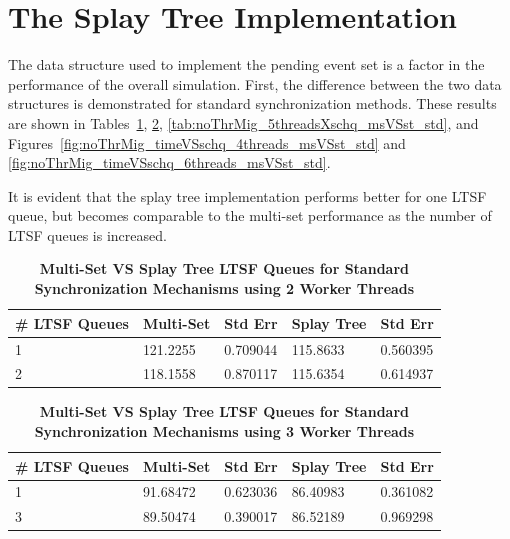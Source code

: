 \documentclass[11pt]{book}
\begin{document}
\section{The Splay Tree Implementation}

The data structure used to implement the pending event set is a factor in the performance
of the overall simulation.  First, the difference between the two data structures is
demonstrated for standard synchronization methods.  These results are shown in
Tables~\ref{tab:noThrMig_2threadsXschq_msVSst_std},
\ref{tab:noThrMig_3threadsXschq_msVSst_std}, 
\ref{tab:noThrMig_5threadsXschq_msVSst_std}, and
Figures~\ref{fig:noThrMig_timeVSschq_4threads_msVSst_std} and
\ref{fig:noThrMig_timeVSschq_6threads_msVSst_std}.

It is evident that the splay tree implementation performs better for one LTSF queue, but
becomes comparable to the multi-set performance as the number of LTSF queues is increased.


\begin{table}
    \centering
    \begin{tabular}{l|p{2cm}|p{2cm}|p{2cm}|p{2cm}}
        \textbf{\# LTSF Queues}&Multi-Set &Std Err &Splay Tree &Std Err\\
        \hline
        \midrule
            1 &121.2255  &0.709044 &115.8633  &0.560395\\ 
            2 &118.1558  &0.870117 &115.6354  &0.614937\\
    \end{tabular}
    \caption{\textbf{Multi-Set VS Splay Tree LTSF Queues for Standard Synchronization
        Mechanisms using 2 Worker Threads}}\label{tab:noThrMig_2threadsXschq_msVSst_std}
\end{table}

\begin{table}
\centering
\begin{tabular}{l|p{2cm}|p{2cm}|p{2cm}|p{2cm}}
    \textbf{\# LTSF Queues}&Multi-Set &Std Err &Splay Tree &Std Err\\
    \hline
    \midrule
        1 &91.68472  &0.623036 &86.40983  &0.361082\\ 
        3 &89.50474  &0.390017 &86.52189  & 0.969298\\
\end{tabular}
\caption{\textbf{Multi-Set VS Splay Tree LTSF Queues for Standard Synchronization
    Mechanisms using 3 Worker Threads}}\label{tab:noThrMig_3threadsXschq_msVSst_std}
\end{table}
\end{document}
